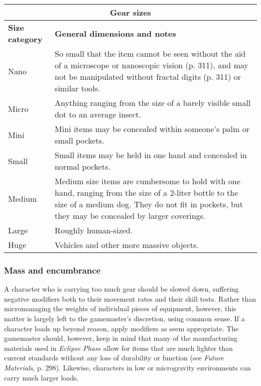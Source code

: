\begin{table}
\begin{tabularx}{\textwidth}{|l|X|}
\hline
\multicolumn{2}{|c|}{\textbf{Gear sizes}}			\\
\hline
\textbf{Size category}	& \textbf{General dimensions and notes} \\ Nano					& So small that the item cannot be seen without the aid of a microscope or nanoscopic vision (p. 311), and may not be manipulated without fractal digits (p. 311) or similar tools. \\
\hline
Micro				& Anything ranging from the size of a barely visible small dot to an average insect. \\
\hline
Mini					& Mini items may be concealed within someone’s palm or small pockets. \\
\hline
Small				& Small items may be held in one hand and concealed in normal pockets.\\
\hline
Medium				& Medium size items are cumbersome to hold with one hand, ranging from the size of a 2-liter bottle to the size of a medium dog. They do not fit in pockets, but they may be concealed by larger coverings. \\
\hline
Large				& Roughly human-sized. \\
\hline
Huge					& Vehicles and other more massive objects. \\
\hline
\end{tabularx}
\label{tab:gear-sizes}
\end{table}


\subsubsection{Mass and encumbrance}

A character who is carrying too much gear should be slowed down, suffering negative modifiers both to their movement rates and their skill tests. Rather than micromanaging the weights of individual pieces of equipment, however, this matter is largely left to the gamemaster’s discretion, using common sense. If a character loads up beyond reason, apply modifiers as seem appropriate. The gamemaster should, however, keep in mind that many of the manufacturing materials used in \emph{Eclipse Phase} allow for items that are much lighter than current standards without any loss of durability or function (see \emph{Future Materials}, p. 298). Likewise, characters in low or microgravity environments can carry much larger loads.

